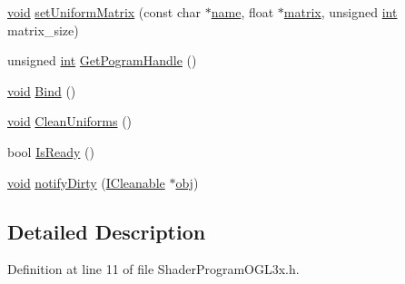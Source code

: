 \begin{DoxyCompactItemize}
\item 
\hyperlink{wglew_8h_aeea6e3dfae3acf232096f57d2d57f084}{void} \hyperlink{class_a_c_t_k_1_1_shader_program_o_g_l3x_af43570da9c7f0153996355f4d686c78a}{set\-Uniform\-Matrix} (const char $\ast$\hyperlink{glew_8h_a5c4947d4516dd7cfa3505ce3a648a4ef}{name}, float $\ast$\hyperlink{glew_8h_a7b24a3f2f56eb1244ae69dacb4fecb6f}{matrix}, unsigned \hyperlink{wglew_8h_a500a82aecba06f4550f6849b8099ca21}{int} matrix\-\_\-size)
\item 
unsigned \hyperlink{wglew_8h_a500a82aecba06f4550f6849b8099ca21}{int} \hyperlink{class_a_c_t_k_1_1_shader_program_o_g_l3x_a38010dda4d004ef679923484385f7b8a}{Get\-Pogram\-Handle} ()
\item 
\hyperlink{wglew_8h_aeea6e3dfae3acf232096f57d2d57f084}{void} \hyperlink{class_a_c_t_k_1_1_shader_program_o_g_l3x_a3507ccb9b70eff00fdc6ad951dee560b}{Bind} ()
\item 
\hyperlink{wglew_8h_aeea6e3dfae3acf232096f57d2d57f084}{void} \hyperlink{class_a_c_t_k_1_1_shader_program_o_g_l3x_a2ba22bc5e88f9158f7507c410cc8c772}{Clean\-Uniforms} ()
\item 
bool \hyperlink{class_a_c_t_k_1_1_shader_program_o_g_l3x_a072297bf029cd6b72b0413c69ac20855}{Is\-Ready} ()
\item 
\hyperlink{wglew_8h_aeea6e3dfae3acf232096f57d2d57f084}{void} \hyperlink{class_a_c_t_k_1_1_shader_program_o_g_l3x_a7ac4a830e1693632a9f43ff77c51ed70}{notify\-Dirty} (\hyperlink{class_a_c_t_k_1_1_i_cleanable}{I\-Cleanable} $\ast$\hyperlink{glew_8h_a0c0d4701a6c89f4f7f0640715d27ab26}{obj})
\end{DoxyCompactItemize}


\subsection{Detailed Description}


Definition at line 11 of file Shader\-Program\-O\-G\-L3x.\-h.




